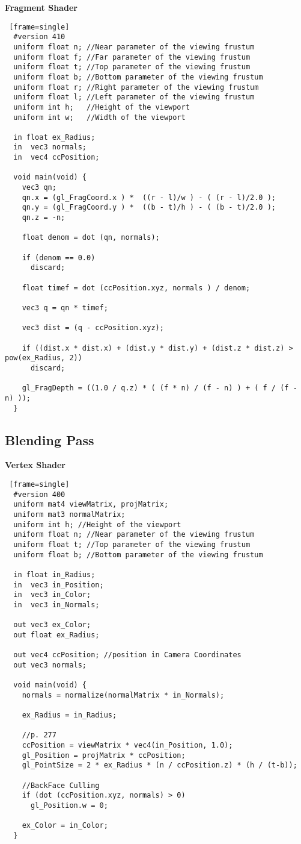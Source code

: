 \textbf{Fragment Shader}
\begin{lstlisting} [frame=single]
  #version 410
  uniform float n; //Near parameter of the viewing frustum
  uniform float f; //Far parameter of the viewing frustum
  uniform float t; //Top parameter of the viewing frustum
  uniform float b; //Bottom parameter of the viewing frustum
  uniform float r; //Right parameter of the viewing frustum
  uniform float l; //Left parameter of the viewing frustum
  uniform int h;   //Height of the viewport
  uniform int w;   //Width of the viewport

  in float ex_Radius;
  in  vec3 normals;
  in  vec4 ccPosition;

  void main(void) {
    vec3 qn;
    qn.x = (gl_FragCoord.x ) *  ((r - l)/w ) - ( (r - l)/2.0 );
    qn.y = (gl_FragCoord.y ) *  ((b - t)/h ) - ( (b - t)/2.0 );
    qn.z = -n;

    float denom = dot (qn, normals);

    if (denom == 0.0)
      discard;

    float timef = dot (ccPosition.xyz, normals ) / denom;

    vec3 q = qn * timef;

    vec3 dist = (q - ccPosition.xyz);

    if ((dist.x * dist.x) + (dist.y * dist.y) + (dist.z * dist.z) > pow(ex_Radius, 2))
      discard;

    gl_FragDepth = ((1.0 / q.z) * ( (f * n) / (f - n) ) + ( f / (f - n) ));
  }
\end{lstlisting}
\newpage

\subsection{Blending Pass}
\textbf{Vertex Shader}
\begin{lstlisting} [frame=single]
  #version 400
  uniform mat4 viewMatrix, projMatrix;
  uniform mat3 normalMatrix;
  uniform int h; //Height of the viewport
  uniform float n; //Near parameter of the viewing frustum
  uniform float t; //Top parameter of the viewing frustum
  uniform float b; //Bottom parameter of the viewing frustum

  in float in_Radius;
  in  vec3 in_Position;
  in  vec3 in_Color;
  in  vec3 in_Normals;

  out vec3 ex_Color;
  out float ex_Radius;

  out vec4 ccPosition; //position in Camera Coordinates
  out vec3 normals;

  void main(void) {
    normals = normalize(normalMatrix * in_Normals);

    ex_Radius = in_Radius;

    //p. 277
    ccPosition = viewMatrix * vec4(in_Position, 1.0);
    gl_Position = projMatrix * ccPosition;
    gl_PointSize = 2 * ex_Radius * (n / ccPosition.z) * (h / (t-b));

    //BackFace Culling
    if (dot (ccPosition.xyz, normals) > 0)
      gl_Position.w = 0;

    ex_Color = in_Color;
  }
\end{lstlisting}
\newpage

